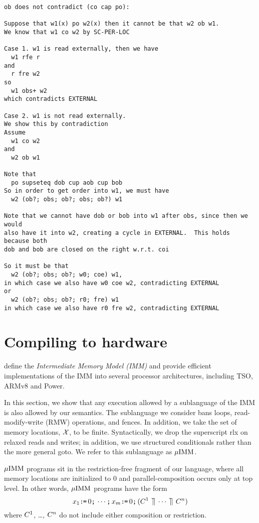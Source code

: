 \begin{verbatim}
ob does not contradict (co cap po):

Suppose that w1(x) po w2(x) then it cannot be that w2 ob w1.
We know that w1 co w2 by SC-PER-LOC

Case 1. w1 is read externally, then we have
  w1 rfe r
and
  r fre w2
so
  w1 obs+ w2
which contradicts EXTERNAL

Case 2. w1 is not read externally.
We show this by contradiction
Assume
  w1 co w2
and
  w2 ob w1

Note that
  po supseteq dob cup aob cup bob
So in order to get order into w1, we must have
  w2 (ob?; obs; ob?; obs; ob?) w1

Note that we cannot have dob or bob into w1 after obs, since then we would
also have it into w2, creating a cycle in EXTERNAL.  This holds because both
dob and bob are closed on the right w.r.t. coi

So it must be that 
  w2 (ob?; obs; ob?; w0; coe) w1, 
in which case we also have w0 coe w2, contradicting EXTERNAL
or 
  w2 (ob?; obs; ob?; r0; fre) w1
in which case we also have r0 fre w2, contradicting EXTERNAL
\end{verbatim}


\section{Compiling to hardware}

\citet{DBLP:journals/pacmpl/PodkopaevLV19} define the \emph{Intermediate
  Memory Model (IMM)} and provide efficient implementations of the IMM into
several processor architectures, including TSO, ARMv8 and Power.

In this section, we show that any execution allowed by a sublanguage of the
IMM is also allowed by our semantics.  The sublanguage we consider bans
loops, read-modify-write (RMW) operations, and fences.  In addition, we take
the set of memory locations, $\mathcal{X}$, to be finite.  Syntactically, we drop
the superscript \textsf{rlx} on relaxed reads and writes; in addition, we use
structured conditionals rather than the more general \textsf{goto}.  We refer
to this sublanguage as $\mu\text{IMM}$.

$\mu\text{IMM}$ programs sit in the restriction-free fragment of our language, where
all memory locations are initialized to $0$ and parallel-composition occurs
only at top level.  In other words, $\mu\text{IMM}$ programs have the form
\begin{displaymath}
  {x_1}\texttt{:}\mkern-1mu\texttt{=}\,{0}\texttt{;}\,
  \cdots\texttt{;}\,
  {x_m}\texttt{:}\mkern-1mu\texttt{=}\,{0}\texttt{;}\,
  (C^1 \,\mathbin{\rrceil}\, \cdots \,\mathbin{\rrceil}\, C^n)
\end{displaymath}
where $C^1$, \ldots, $C^n$ do not include either composition or
restriction.

